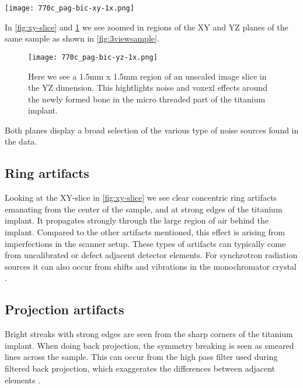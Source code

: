 \begin{figure*}
\centering
\texttt{[image: 770c\_pag-bic-xy-1x.png]}
\caption{Here we see a 1mm x 2mm region of an unscaled image slice in the XY dimension. It highlights
some of the imperfections and noise present in the data. We especially see artifacts within and
around the titanium implant.}
\label{fig:xy-slice}
\end{figure*}

In \cref{fig:xy-slice} and \cref{fig:yz-slice} we see zoomed in regions of the XY and YZ planes
of the same sample as shown in \cref{fig:3viewsample}.

\begin{figure}
\centering
\texttt{[image: 770c\_pag-bic-yz-1x.png]}
\caption{Here we see a 1.5mm x 1.5mm region of an unscaled image slice in the YZ dimension. This
hightlights noise and voxexl effects around the newly formed bone in the micro threaded part of
the titanium implant.}
\label{fig:yz-slice}
\end{figure}

Both planes display a broad selection of the various type of noise sources found in the data.

\subsection{Ring artifacts}

Looking at the XY-slice in \cref{fig:xy-slice} we see clear concentric ring artifacts emanating from
the center of the sample, and at strong edges of the titanium implant. It propagates strongly through
the large region of air behind the implant. Compared to the other artifacts mentioned, this effect is
arising from imperfections in the scanner setup. These types of artifacts can typically come from
uncalibrated or defect adjacent detector elements. For synchrotron radiation sources it can also
occur from shifts and vibrations in the monochromator crystal \citep{ringartifacts}.

\subsection{Projection artifacts}

Bright streaks with strong edges are seen from the sharp corners of the titanium implant. When
doing back projection, the symmetry breaking is seen as smeared lines across the sample. This
can occur from the high pass filter used during filtered back projection, which exaggerates the
differences between adjacent elements \citep{ctnoise}.

